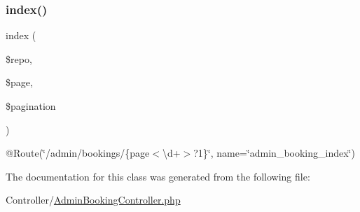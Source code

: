 \subsubsection{\texorpdfstring{index()}{index()}}
{\footnotesize\ttfamily index (\begin{DoxyParamCaption}\item[{\mbox{\hyperlink{class_app_1_1_repository_1_1_booking_repository}{Booking\+Repository}}}]{\$repo,  }\item[{}]{\$page,  }\item[{\mbox{\hyperlink{class_app_1_1_service_1_1_pagination_service}{Pagination\+Service}}}]{\$pagination }\end{DoxyParamCaption})}

@\+Route(\char`\"{}/admin/bookings/\{page$<$\textbackslash{}d+$>$?1\}\char`\"{}, name=\char`\"{}admin\+\_\+booking\+\_\+index\char`\"{}) 

The documentation for this class was generated from the following file\+:\begin{DoxyCompactItemize}
\item 
Controller/\mbox{\hyperlink{_admin_booking_controller_8php}{Admin\+Booking\+Controller.\+php}}\end{DoxyCompactItemize}
